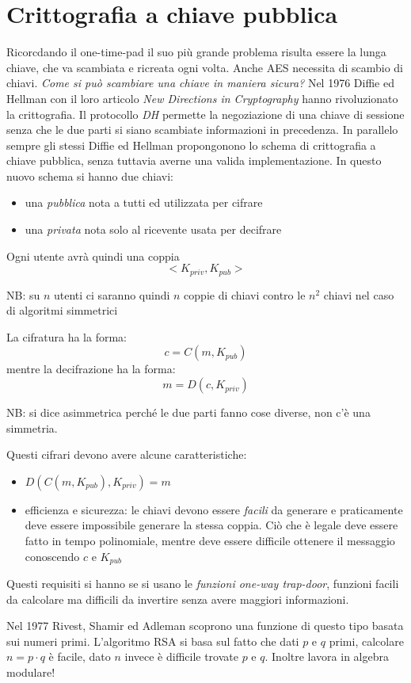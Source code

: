 \section{Crittografia a chiave pubblica}
Ricorcdando il one-time-pad il suo più grande problema risulta essere la lunga chiave, che va scambiata e ricreata ogni volta.
Anche AES necessita di scambio di chiavi.
\emph{Come si può scambiare una chiave in maniera sicura?}
Nel 1976 Diffie ed Hellman con il loro articolo \emph{New Directions in Cryptography} hanno rivoluzionato la crittografia.
Il protocollo \emph{DH} permette la negoziazione di una chiave di sessione senza che le due parti si siano scambiate informazioni in precedenza.
In parallelo sempre gli stessi Diffie ed Hellman propongonono lo schema di crittografia a chiave pubblica, senza tuttavia averne una valida implementazione.
In questo nuovo schema si hanno due chiavi:
\begin{itemize}
    \item una \emph{pubblica} nota a tutti ed utilizzata per cifrare
    \item una \emph{privata} nota solo al ricevente usata per decifrare
\end{itemize}
Ogni utente avrà quindi una coppia
$$ <K_{priv}, K_{pub}> $$

NB: su $n$ utenti ci saranno quindi $n$ coppie di chiavi contro le $n^2$ chiavi nel caso di algoritmi simmetrici

La cifratura ha la forma:
$$ c = C(m, K_{pub}) $$
mentre la decifrazione ha la forma:
$$ m = D(c, K_{priv})$$

NB: si dice asimmetrica perché le due parti fanno cose diverse, non c'è una simmetria.

Questi cifrari devono avere alcune caratteristiche:
\begin{itemize}
    \item $D(C(m, K_{pub}), K_{priv}) = m$
    \item efficienza e sicurezza: le chiavi devono essere \emph{facili} da generare e praticamente deve essere impossibile generare la stessa coppia.
    Ciò che è legale deve essere fatto in tempo polinomiale, mentre deve essere difficile ottenere il messaggio conoscendo $c$ e $K_{pub}$
\end{itemize}

Questi requisiti si hanno se si usano le \emph{funzioni one-way trap-door}, funzioni facili da calcolare ma difficili da invertire senza avere maggiori informazioni.

Nel 1977 Rivest, Shamir ed Adleman scoprono una funzione di questo tipo basata sui numeri primi.
L'algoritmo RSA si basa sul fatto che dati $p$ e $q$ primi, calcolare $n = p \cdot q$ è facile, dato $n$ invece è difficile trovate $p$ e $q$.
Inoltre lavora in algebra modulare!

